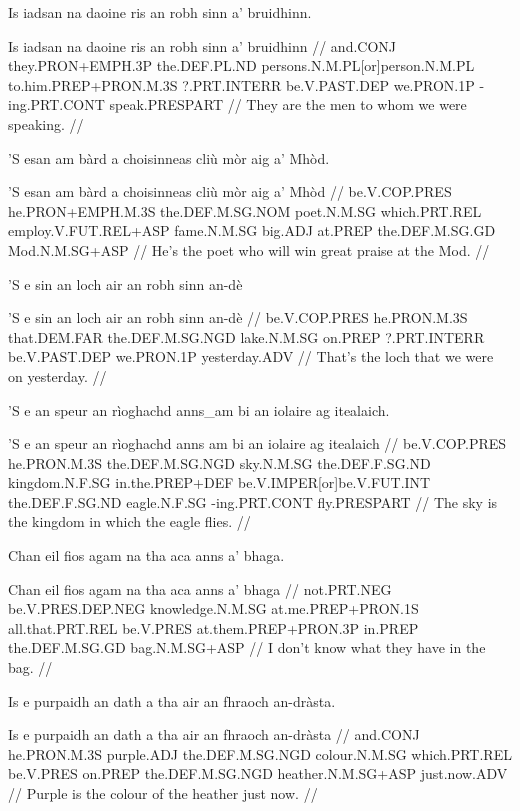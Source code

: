 \documentclass[a4paper,10pt]{article}
\begin{document}
\ex
\begingl
\glpre Is iadsan na daoine ris an robh sinn a' bruidhinn. 

\vspace{4mm}
\gla Is iadsan na daoine ris an robh sinn a' bruidhinn  //
\glb and.CONJ they.PRON+EMPH.3P the.DEF.PL.ND persons.N.M.PL[or]person.N.M.PL to.him.PREP+PRON.M.3S ?.PRT.INTERR be.V.PAST.DEP we.PRON.1P -ing.PRT.CONT speak.PRESPART  //
\glft They are the men to whom we were speaking. //
\endgl
\xe

\ex
\begingl
\glpre 'S esan am bàrd a choisinneas cliù mòr aig a' Mhòd. 

\vspace{4mm}
\gla 'S esan am bàrd a choisinneas cliù mòr aig a' Mhòd  //
\glb be.V.COP.PRES he.PRON+EMPH.M.3S the.DEF.M.SG.NOM poet.N.M.SG which.PRT.REL employ.V.FUT.REL+ASP fame.N.M.SG big.ADJ at.PREP the.DEF.M.SG.GD Mod.N.M.SG+ASP  //
\glft He's the poet who will win great praise at the Mod. //
\endgl
\xe

\ex
\begingl
\glpre 'S e sin an loch air an robh sinn an-dè 

\vspace{4mm}
\gla 'S e sin an loch air an robh sinn an-dè  //
\glb be.V.COP.PRES he.PRON.M.3S that.DEM.FAR the.DEF.M.SG.NGD lake.N.M.SG on.PREP ?.PRT.INTERR be.V.PAST.DEP we.PRON.1P yesterday.ADV  //
\glft That's the loch that we were on yesterday. //
\endgl
\xe

\ex
\begingl
\glpre 'S e an speur an rìoghachd anns\_am bi an iolaire ag itealaich. 

\vspace{4mm}
\gla 'S e an speur an rìoghachd {anns am} bi an iolaire ag itealaich  //
\glb be.V.COP.PRES he.PRON.M.3S the.DEF.M.SG.NGD sky.N.M.SG the.DEF.F.SG.ND kingdom.N.F.SG in.the.PREP+DEF be.V.IMPER[or]be.V.FUT.INT the.DEF.F.SG.ND eagle.N.F.SG -ing.PRT.CONT fly.PRESPART  //
\glft The sky is the kingdom in which the eagle flies. //
\endgl
\xe

\ex
\begingl
\glpre Chan eil fios agam na tha aca anns a' bhaga. 

\vspace{4mm}
\gla Chan eil fios agam na tha aca anns a' bhaga  //
\glb not.PRT.NEG be.V.PRES.DEP.NEG knowledge.N.M.SG at.me.PREP+PRON.1S all.that.PRT.REL be.V.PRES at.them.PREP+PRON.3P in.PREP the.DEF.M.SG.GD bag.N.M.SG+ASP  //
\glft I don't know what they have in the bag. //
\endgl
\xe

\ex
\begingl
\glpre Is e purpaidh an dath a tha air an fhraoch an-dràsta. 

\vspace{4mm}
\gla Is e purpaidh an dath a tha air an fhraoch an-dràsta  //
\glb and.CONJ he.PRON.M.3S purple.ADJ the.DEF.M.SG.NGD colour.N.M.SG which.PRT.REL be.V.PRES on.PREP the.DEF.M.SG.NGD heather.N.M.SG+ASP just.now.ADV  //
\glft Purple is the colour of the heather just now. //
\endgl
\xe
\end{document}
